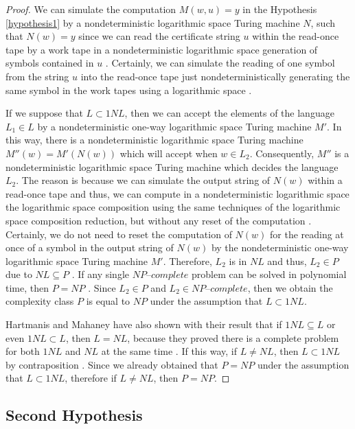 \documentclass[a4paper,UKenglish,cleveref, autoref]{lipics-v2019}
\begin{document}
\begin{proof}
We can simulate the computation $M(w, u) = y$ in the Hypothesis \ref{hypothesis1} by a nondeterministic logarithmic space Turing machine $N$, such that $N(w) = y$ since we can read the certificate string $u$ within the read-once tape by a work tape in a nondeterministic logarithmic space generation of symbols contained in $u$ \cite{Pap03}. Certainly, we can simulate the reading of one symbol from the string $u$ into the read-once tape just nondeterministically generating the same symbol in the work tapes using a logarithmic space \cite{Pap03}.

If we suppose that $L \subset 1NL$, then we can accept the elements of the language $L_{1} \in L$ by a nondeterministic one-way logarithmic space Turing machine $M'$. In this way, there is a nondeterministic logarithmic space Turing machine $M''(w) = M'(N(w))$ which will accept when $w \in L_{2}$. Consequently, $M''$ is a nondeterministic logarithmic space Turing machine which decides the language $L_{2}$. The reason is because we can simulate the output string of $N(w)$ within a read-once tape and thus, we can compute in a nondeterministic logarithmic space the logarithmic space composition using the same techniques of the logarithmic space composition reduction, but without any reset of the computation \cite{Pap03}. Certainly, we do not need to reset the computation of $N(w)$ for the reading at once of a symbol in the output string of $N(w)$ by the nondeterministic one-way logarithmic space Turing machine $M'$. Therefore, $L_{2}$ is in $NL$ and thus, $L_{2} \in P$ due to $NL \subseteq P$ \cite{Pap03}. If any single $\textit{NP--complete}$ problem can be solved in polynomial time, then $P = NP$ \cite{CLRS01}. Since $L_{2} \in P$ and $L_{2} \in \textit{NP--complete}$, then we obtain the complexity class $P$ is equal to $NP$ under the assumption that $L \subset 1NL$.

Hartmanis and Mahaney have also shown with their result that if $1NL \subseteq L$ or even $1NL \subset L$, then $L=NL$, because they proved there is a complete problem for both $1NL$ and $NL$ at the same time \cite{HM81}. If this way, if $L \neq NL$, then $L \subset 1NL$ by contraposition \cite{Pap03}. Since we already obtained that $P = NP$ under the assumption that $L \subset 1NL$, therefore if $L \neq NL$, then $P = NP$.
\end{proof}

\subsection{Second Hypothesis}
\end{document}
